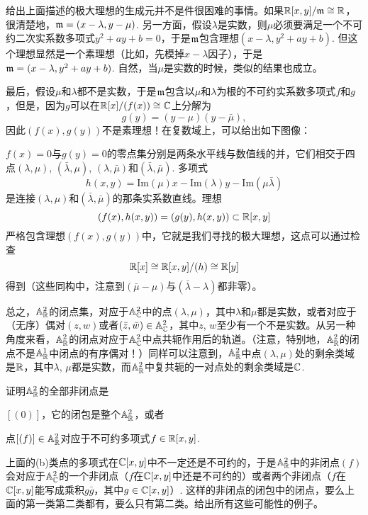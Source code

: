给出上面描述的极大理想的生成元并不是件很困难的事情。如果$\mathbb{R}[x,y]/\mathfrak{m}\cong \mathbb{R} $，很清楚地，$\mathfrak{m}=(x-\lambda,y-\mu)$. 另一方面，假设$\lambda$是实数，则$\mu$必须要满足一个不可约二次实系数多项式$y^2+ay+b=0$，于是$\mathfrak{m}$包含理想$(x-\lambda,y^2+ay+b)$. 但这个理想显然是一个素理想（比如，先模掉$x-\lambda$因子），于是$\mathfrak{m}=(x-\lambda,y^2+ay+b)$. 自然，当$\mu$是实数的时候，类似的结果也成立。

最后，假设$\mu$和$\lambda$都不是实数，于是$\mathfrak{m}$包含以$\mu$和$\lambda$为根的不可约实系数多项式$f$和$g$，但是，因为$g$可以在$\mathbb{R}[x]/(f(x))\cong \mathbb{C}$上分解为
\[
	g(y)=(y-\mu)(y-\bar\mu),
\]
因此$(f(x),g(y))$不是素理想！在复数域上，可以给出如下图像：


$f(x)=0$与$g(y)=0$的零点集分别是两条水平线与数值线的并，它们相交于四点$(\lambda,\mu)$, $(\bar\lambda,\mu)$, $(\lambda,\bar\mu)$和$(\bar\lambda,\bar\mu)$. 多项式
\[
	h(x,y)=\mathrm{Im}(\mu) x - \mathrm{Im}(\lambda)  y -\mathrm{Im}(\mu\bar\lambda)
\]
是连接$(\lambda,\mu)$和$(\bar\lambda,\bar\mu)$的那条实系数直线。理想
\[
	(f(x),h(x,y))=(g(y),h(x,y))\subset \mathbb{R}[x,y]
\]
严格包含理想$(f(x),g(y))$中，它就是我们寻找的极大理想，这点可以通过检查
\[
	\mathbb{R}[x]\cong \mathbb{R}[x,y]/(h)\cong \mathbb{R}[y]
\]
得到（这些同构中，注意到$(\bar\mu-\mu)$与$(\bar\lambda-\lambda)$都非零）。

总之，$\mathbb{A}_{\mathbb{R}}^2$的闭点集，对应于$\mathbb{A}_{\mathbb{C}}^2$中的点$(\lambda,\mu)$，其中$\lambda$和$\mu$都是实数，或者对应于（无序）偶对$(z,w)$或者$(\bar z,\bar w)\in \mathbb{A}_{\mathbb{C}}^2$，其中$z$, $w$至少有一个不是实数。从另一种角度来看，$\mathbb{A}_{\mathbb{R}}^2$的闭点对应于$\mathbb{A}_{\mathbb{C}}^2$中点共轭作用后的轨道。（注意，特别地，$\mathbb{A}_{\mathbb{R}}^2$的闭点不是$\mathbb{A}_{\mathbb{R}}^1$中闭点的有序偶对！）同样可以注意到，$\mathbb{A}_{\mathbb{R}}^2$中点$(\lambda,\mu)$处的剩余类域是$\mathbb{R}$，其中$\lambda$, $\mu$都是实数，而$\mathbb{A}_{\mathbb{R}}^2$中复共轭的一对点处的剩余类域是$\mathbb{C}$.

\begin{exe}
	证明$\mathbb{A}^2_{\mathbb{R}}$的全部非闭点是
	\begin{compactenum}[(a)]
		\item $[(0)]$，它的闭包是整个$\mathbb{A}^2_{\mathbb{R}}$，或者
		\item 点$[(f)]\in \mathbb{A}^2_{\mathbb{R}}$对应于不可约多项式$f\in \mathbb{R}[x,y]$.
	\end{compactenum}

	上面的(b)类点的多项式在$\mathbb{C}[x,y]$中不一定还是不可约的，于是$\mathbb{A}^2_{\mathbb{R}}$中的非闭点$(f)$会对应于$\mathbb{A}^2_{\mathbb{C}}$的一个非闭点（$f$在$\mathbb{C}[x,y]$中还是不可约的）或者两个非闭点（$f$在$\mathbb{C}[x,y]$能写成乘积$g\bar g$，其中$g\in\mathbb{C}[x,y]$）. 这样的非闭点的闭包中的闭点，要么上面的第一类第二类都有，要么只有第二类。给出所有这些可能性的例子。
\end{exe}

